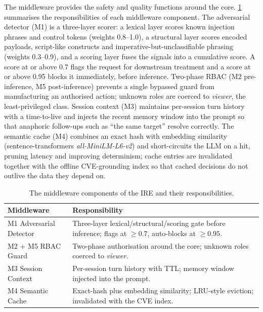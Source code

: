 The middleware provides the safety and quality functions around the core.
\cref{tab:ire-middleware} summarises the responsibilities of each middleware
component. The adversarial detector (M1) is a three-layer scorer: a lexical
layer scores known injection phrases and control tokens (weights 0.8--1.0), a
structural layer scores encoded payloads, script-like constructs and
imperative-but-unclassifiable phrasing (weights 0.3--0.9), and a scoring layer
fuses the signals into a cumulative score. A score at or above 0.7 flags the
request for downstream treatment and a score at or above 0.95 blocks it
immediately, before inference. Two-phase RBAC (M2 pre-inference, M5
post-inference) prevents a single bypassed guard from manufacturing an
authorised action; unknown roles are coerced to \emph{viewer}, the
least-privileged class. Session context (M3) maintains per-session turn history
with a time-to-live and injects the recent memory window into the prompt so that
anaphoric follow-ups such as ``the same target'' resolve correctly. The semantic
cache (M4) combines an exact hash with embedding similarity (sentence-transformers
\emph{all-MiniLM-L6-v2}) and short-circuits the LLM on a hit, pruning latency and
improving determinism; cache entries are invalidated together with the offline
CVE-grounding index so that cached decisions do not outlive the data they depend
on.

\begin{table}[htbp]
  \centering
  \begin{tabular}{@{}p{}p{}@{}}
    \toprule
    \textbf{Middleware} & \textbf{Responsibility}\\
    \midrule
    M1 Adversarial Detector & Three-layer lexical/structural/scoring gate before inference; flags at \(\ge0.7\), auto-blocks at \(\ge0.95\).\\
    M2 + M5 RBAC Guard & Two-phase authorisation around the core; unknown roles coerced to \emph{viewer}.\\
    M3 Session Context & Per-session turn history with TTL; memory window injected into the prompt.\\
    M4 Semantic Cache & Exact-hash plus embedding similarity; LRU-style eviction; invalidated with the CVE index.\\
    \bottomrule
  \end{tabular}
  \caption{The middleware components of the IRE and their responsibilities.}\label{tab:ire-middleware}
\end{table}

